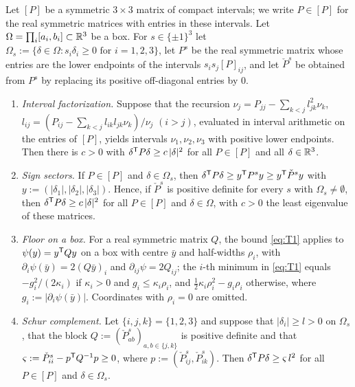 \begin{lemma}\label{lem:det-positive}
Let $[P]$ be a symmetric $3\times3$ matrix of compact intervals; we write $P\in[P]$ for the real symmetric matrices with entries in
these intervals. Let $\Omega=\prod_i[a_i,b_i]\subset\mathbb R^3$ be a box. For $s\in\{\pm1\}^3$ let
$\Omega_s:=\{\delta\in\Omega:s_i\delta_i\ge0\text{ for }i=1,2,3\}$, let $P^s$ be the real symmetric matrix whose entries are the
lower endpoints of the intervals $s_is_j[P]_{ij}$, and let $\check P^s$ be obtained from $P^s$ by replacing its positive off-diagonal
entries by $0$.
\begin{enumerate}
\item[\textup{(i)}] \emph{Interval factorization.} Suppose that the recursion
$\nu_j=P_{jj}-\sum_{k<j}l_{jk}^2\nu_k$, $l_{ij}=(P_{ij}-\sum_{k<j}l_{ik}l_{jk}\nu_k)/\nu_j$ $(i>j)$, evaluated in interval arithmetic
on the entries of $[P]$, yields intervals $\nu_1,\nu_2,\nu_3$ with positive lower endpoints. Then there is $c>0$ with
$\delta^\mathsf T P\delta\ge c\,|\delta|^2$ for all $P\in[P]$ and all $\delta\in\mathbb R^3$.
\item[\textup{(ii)}] \emph{Sign sectors.} If $P\in[P]$ and $\delta\in\Omega_s$, then $\delta^\mathsf T P\delta\ge y^\mathsf T P^sy\ge y^\mathsf T\check P^sy$
with $y:=(|\delta_1|,|\delta_2|,|\delta_3|)$. Hence, if $\check P^s$ is positive definite for every $s$ with $\Omega_s\ne\emptyset$,
then $\delta^\mathsf T P\delta\ge c\,|\delta|^2$ for all $P\in[P]$ and $\delta\in\Omega$, with $c>0$ the least eigenvalue of these matrices.
\item[\textup{(iii)}] \emph{Floor on a box.} For a real symmetric matrix $Q$, the bound \eqref{eq:T1} applies to $\psi(y)=y^\mathsf T Qy$
on a box with centre $\bar y$ and half-widths $\rho_i$, with $\partial_i\psi(\bar y)=2(Q\bar y)_i$ and $\partial_{ij}\psi=2Q_{ij}$; the
$i$-th minimum in \eqref{eq:T1} equals $-g_i^2/(2\kappa_i)$ if $\kappa_i>0$ and $g_i\le\kappa_i\rho_i$, and
$\frac12\kappa_i\rho_i^2-g_i\rho_i$ otherwise, where $g_i:=|\partial_i\psi(\bar y)|$. Coordinates with $\rho_i=0$ are omitted.
\item[\textup{(iv)}] \emph{Schur complement.} Let $\{i,j,k\}=\{1,2,3\}$ and suppose that $|\delta_i|\ge l>0$ on $\Omega_s$, that the
block $Q:=(\check P^s_{ab})_{a,b\in\{j,k\}}$ is positive definite and that $\varsigma:=\check P^s_{ii}-p^\mathsf T Q^{-1}p\ge0$, where
$p:=(\check P^s_{ij},\check P^s_{ik})$. Then $\delta^\mathsf T P\delta\ge\varsigma\,l^2$ for all $P\in[P]$ and $\delta\in\Omega_s$.
\end{enumerate}
\end{lemma}

